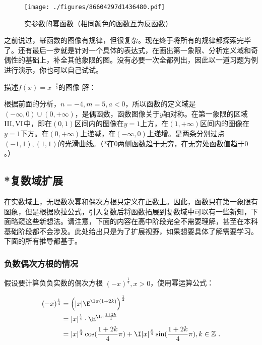 \begin{figure}[ht]
\centering
\texttt{[image: ./figures/86604297d1436480.pdf]}
\caption{实参数的幂函数（相同颜色的函数互为反函数）}\label{fig_power_1}
\end{figure}

之前说过，幂函数的图像有规律，但很复杂。现在终于将所有的规律都探索完毕了。还有最后一步就是针对一个具体的表达式，在画出第一象限、分析定义域和奇偶性的基础上，补全其他象限的图。没有必要一次全都列出，因此以一道习题为例进行演示，你也可以自己试试。

\begin{exercise}{描述$f(x)=x^{-\frac{4}{5}}$的图像}
解：

根据前面的分析，$n=-4,m=5,a<0$，所以函数的定义域是$({-\infty},0)\cup(0,{+\infty})$，是偶函数，函数图像关于$y$轴对称。在第一象限的区域$\rm{III,VI}$中，即在$(0,1)$区间内的图像在$y=1$上方，在$(1,+\infty)$区间内的图像在$y=1$下方。在$(0,{+\infty})$上递减，在$({-\infty},0)$上递增。是两条分别过点$(-1,1),(1,1)$的光滑曲线。（*在$0$两侧函数趋于无穷，在无穷处函数值趋于$0$。）
\end{exercise}

\subsection{*复数域扩展}\label{sub_power_2}


在实数域上，无理数次幂和偶次方根只定义在正数上。因此，函数只在第一象限有图象，但是根据欧拉公式，引入复数后将函数拓展到复数域中可以有一些新知，下面略窥这些新想法。请注意，下面的内容在高中阶段完全不需要理解，甚至在本科基础阶段都不会涉及。此处给出只是为了扩展视野，如果想要具体了解需要学习。下面的所有推导都基于。

\subsubsection{负数偶次方根的情况}

假设要计算负负实数的偶次方根 $(-x)^{\frac{1}{4}},x>0$，使用幂运算公式：

\begin{equation}
\begin{split}
\displaystyle
(-x)^{\frac{1}{4}} &= \left( |x| \E^{\I\pi(1+2k)} \right)^{\frac{1}{4}} \\
&=|x|^{\frac{1}{4}} \cdot \E^{\I\pi\frac{1+2k}{4}}\\
&=|x|^{\frac{\pi}{4}}\cos(\frac{1+2k}{4}\pi) + \I|x|^{\frac{\pi}{4}}\sin(\frac{1+2k}{4}\pi),k\in\mathbb{Z}~.
\end{split}
\end{equation}

